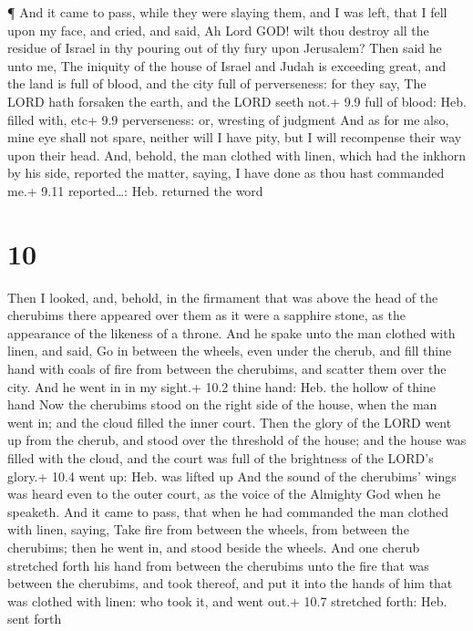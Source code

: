  ¶ And it came to pass, while they were slaying them, and I
was left, that I fell upon my face, and cried, and said, Ah Lord GOD!
wilt thou destroy all the residue of Israel in thy pouring out of thy
fury upon Jerusalem?  Then said he unto me, The iniquity of
the house of Israel and Judah is exceeding great, and the land is full
of blood, and the city full of perverseness: for they say, The LORD hath
forsaken the earth, and the LORD seeth not.+ 9.9 full of blood: Heb.
filled with, etc+ 9.9 perverseness: or, wresting of judgment
 And as for me also, mine eye shall not spare, neither will
I have pity, but I will recompense their way upon their head.
 And, behold, the man clothed with linen, which had the
inkhorn by his side, reported the matter, saying, I have done as thou
hast commanded me.+ 9.11 reported\ldots: Heb. returned the word

\hypertarget{section-9}{%
\section{10}\label{section-9}}

 Then I looked, and, behold, in the firmament that was above
the head of the cherubims there appeared over them as it were a sapphire
stone, as the appearance of the likeness of a throne.  And
he spake unto the man clothed with linen, and said, Go in between the
wheels, even under the cherub, and fill thine hand with coals of fire
from between the cherubims, and scatter them over the city. And he went
in in my sight.+ 10.2 thine hand: Heb. the hollow of thine hand
 Now the cherubims stood on the right side of the house,
when the man went in; and the cloud filled the inner court. 
Then the glory of the LORD went up from the cherub, and stood over the
threshold of the house; and the house was filled with the cloud, and the
court was full of the brightness of the LORD's glory.+ 10.4 went up:
Heb. was lifted up  And the sound of the cherubims' wings
was heard even to the outer court, as the voice of the Almighty God when
he speaketh.  And it came to pass, that when he had
commanded the man clothed with linen, saying, Take fire from between the
wheels, from between the cherubims; then he went in, and stood beside
the wheels.  And one cherub stretched forth his hand from
between the cherubims unto the fire that was between the cherubims, and
took thereof, and put it into the hands of him that was clothed with
linen: who took it, and went out.+ 10.7 stretched forth: Heb. sent forth


